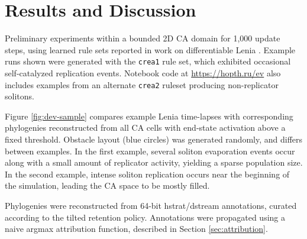 \section{Results and Discussion} \label{sec:results}

Preliminary experiments within a bounded 2D CA domain for 1,000 update steps, using learned rule sets reported in work on differentiable Lenia
\citep{hamon2022learning}.
Example runs shown were generated with the \texttt{crea1} rule set, which exhibited occasional self-catalyzed replication events.
Notebook code at \url{https://hopth.ru/ev} also includes examples from an alternate \texttt{crea2} ruleset producing non-replicator solitons.



Figure \ref{fig:dev-sample} compares example Lenia time-lapses with corresponding phylogenies reconstructed from all CA cells with end-state activation above a fixed threshold.
Obstacle layout (blue circles) was generated randomly, and differs between examples.
In the first example, several soliton evaporation events occur along with a small amount of replicator activity, yielding a sparse population size.
In the second example, intense soliton replication occurs near the beginning of the simulation, leading the CA space to be mostly filled.

Phylogenies were reconstructed from 64-bit hstrat/dstream annotations, curated according to the tilted retention policy.
Annotations were propagated using a naive argmax attribution function, described in Section \ref{sec:attribution}.
